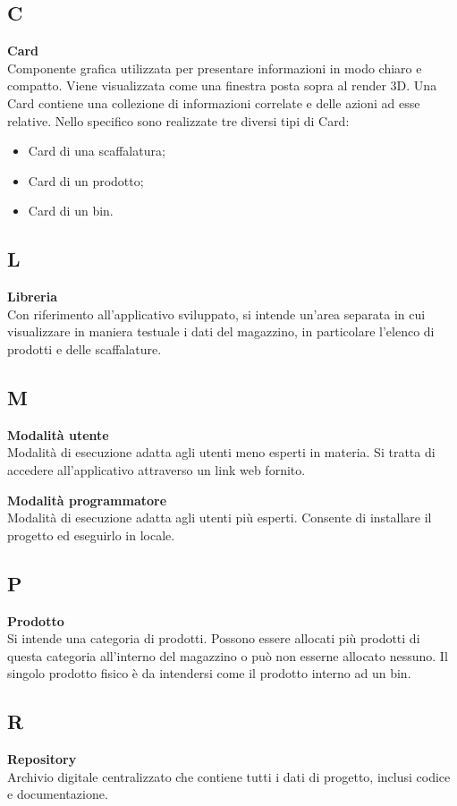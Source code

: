 \subsection*{C}
\textbf{Card}\\
Componente grafica utilizzata per presentare informazioni in modo chiaro e compatto. Viene visualizzata come una finestra posta sopra al render 3D. Una Card contiene una collezione di informazioni correlate e delle azioni ad esse relative. Nello specifico sono realizzate tre diversi tipi di Card:
\begin{itemize}
    \item Card di una scaffalatura;
    \item Card di un prodotto;
    \item Card di un bin.
\end{itemize}

\subsection*{L}
\textbf{Libreria}\\
Con riferimento all’applicativo sviluppato, si intende un’area separata in cui visualizzare in maniera testuale i dati del magazzino, in particolare l'elenco di prodotti e delle scaffalature.

\subsection*{M}
\textbf{Modalità utente}\\
Modalità di esecuzione adatta agli utenti meno esperti in materia. Si tratta di accedere all'applicativo attraverso un link web fornito.

\bigskip
\noindent \textbf{Modalità programmatore}\\
Modalità di esecuzione adatta agli utenti più esperti. Consente di installare il progetto ed eseguirlo in locale.

\subsection*{P}
\textbf{Prodotto}\\
Si intende una categoria di prodotti. Possono essere allocati più prodotti di questa categoria all'interno del magazzino o può non esserne allocato nessuno. Il singolo prodotto fisico è da intendersi come il prodotto interno ad un bin.

\subsection*{R}
\textbf{Repository}\\
Archivio digitale centralizzato che contiene tutti i dati di progetto, inclusi codice e documentazione.


